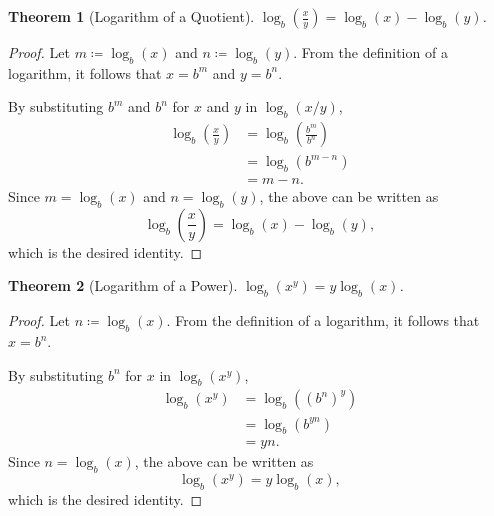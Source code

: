 \documentclass[headings=standardclasses]{scrartcl}
\newtheorem{theorem}{Theorem}[subsection]
\theoremstyle{definition}
\begin{document}
\begin{theorem}[Logarithm of a Quotient]
  \(\displaystyle \log_{b}\left(\frac{x}{y}\right) = \log_{b}(x) -
  \log_{b}(y)\).
\end{theorem}

\begin{proof}
  Let \(m ≔ \log_b(x)\) and \(n ≔ \log_b(y)\). From the definition of a
  logarithm, it follows that \(x = b^m\) and \(y = b^n\).

  By substituting \(b^m\) and \(b^n\) for \(x\) and \(y\) in \(\log_b(x/y)\),
  \begin{equation*}
  \begin{split}
    \log_b\left(\frac{x}{y}\right) &= \log_b\left(\frac{b^m}{b^n}\right) \\
                                   &= \log_b(b^{m - n}) \\
                                   &= m - n.
  \end{split}
  \end{equation*}
  Since \(m = \log_b(x)\) and \(n = \log_b(y)\), the above can be written as
  \begin{equation*}
    \log_b\left(\frac{x}{y}\right) = \log_{b}(x) - \log_{b}(y),
  \end{equation*}
  which is the desired identity.
\end{proof}

\begin{theorem}[Logarithm of a Power]
  \(\displaystyle \log_{b}(x^y) = y\log_{b}(x)\).
\end{theorem}

\begin{proof}
  Let \(n ≔ \log_b(x)\). From the definition of a logarithm, it follows that
  \(x = b^n\).

  By substituting \(b^n\) for \(x\) in \(\log_b(x^y)\),
  \begin{equation*}
  \begin{split}
    \log_b(x^y) &= \log_b({(b^n)}^y) \\
                &= \log_b(b^{yn}) \\
                &= yn.
  \end{split}
  \end{equation*}
  Since \(n = \log_b(x)\), the above can be written as
  \begin{equation*}
    \log_b(x^y) = y\log_b(x),
  \end{equation*}
  which is the desired identity.
\end{proof}
\end{document}
